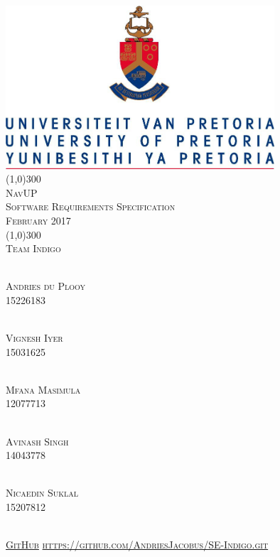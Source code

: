 \documentclass[runningheads,a4paper]{article}
\begin{document}
	\begin{titlepage}
		\begin{center}
			\includegraphics[width=10cm]{UP.jpg}  \\
			[1cm]
			\line(1,0){300} \\
			[0.3cm]
			\textsc{\Large
				NavUP\\
				Software Requirements Specification\\
			\hfill {} February 2017
			}\\
			[0.1cm]
			\line(1,0){300} \\
			[0.7cm]
			\textsc{\Large
				Team Indigo
			} \\
			
			
			
		\end{center}
		
		\begin{center}
			\begin{multicols}{2}
				\textsc{\large\\
				Andries du Plooy\\ 
					15226183\\ 
				}
				
				\textsc{\large\\
				Vignesh Iyer\\
					 15031625\\ 
				}
				
				\textsc{\large\\
		        Mfana Masimula\\
				 	12077713\\ 
				}
				
				\columnbreak
				
				\textsc{\large\\
					 Avinash Singh\\
					14043778\\
				}
				
				\textsc{\large\\
					Nicaedin Suklal\\
					15207812\\
				}
				
			\end{multicols}
			
			
			\textsc{	\\ \href{https://github.com/AndriesJacobus/SE-Indigo}{GitHub}
				\url{https://github.com/AndriesJacobus/SE-Indigo.git}}
			
		\end{center}
	\end{titlepage}
\end{document}
